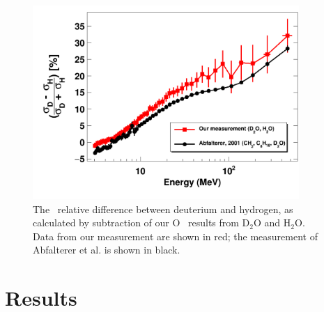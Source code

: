\begin{figure}[ht!]
    \centering
    \includegraphics[width=0.9\textwidth]{figures/relativeDiff_DtoH.png}
    \caption[\tot\ relative difference between deuterium and hydrogen from our measurement]
    {The \tot\ relative difference between deuterium and hydrogen,
        as calculated by subtraction of our O \tot\ results from
        D$_{2}$O and H$_{2}$O. Data from our measurement are shown in red; the measurement of
        Abfalterer et al. \cite{Abfalterer1998} is shown in black.}
    \label{DtoH}
\end{figure}

\section{Results}
